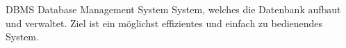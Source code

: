   {DBMS}            %
  { Database Management System}  %
  {System, welches die Datenbank aufbaut und verwaltet. Ziel ist ein möglichst effizientes und einfach zu bedienendes System.} %




